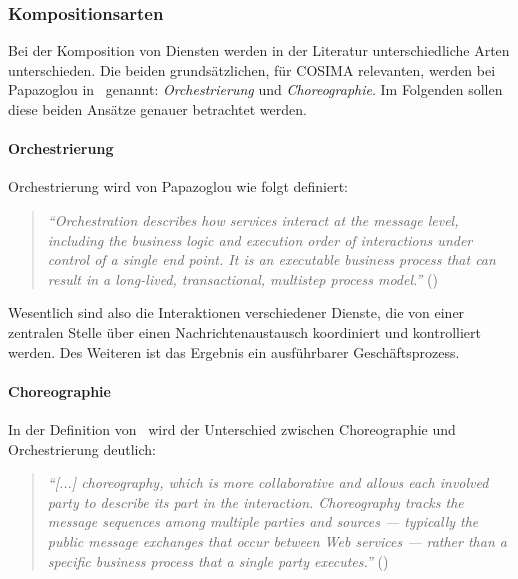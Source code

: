 \subsubsection{Kompositionsarten} %
\label{ssub:kompositionsarten}

  Bei der Komposition von Diensten werden in der Literatur unterschiedliche Arten unterschieden. Die beiden grundsätzlichen, für COSIMA relevanten, werden bei Papazoglou in~\citep[S. 41]{papazoglou2007soc} genannt: \emph{Orchestrierung} und \emph{Choreographie}. Im Folgenden sollen diese beiden Ansätze genauer betrachtet werden.
  
\paragraph{Orchestrierung} %
\label{par:orchestrierung}
  
  Orchestrierung wird von Papazoglou wie folgt definiert:
  
  \begin{quote}
    \emph{"`Orchestration describes how services interact at the message level, including the business logic and execution order of interactions under control of a single end point. It is an executable business process that can result in a long-lived, transactional, multistep process model."'} (\citep[S. 41]{papazoglou2007soc})
  \end{quote}
  
  Wesentlich sind also die Interaktionen verschiedener Dienste, die von einer zentralen Stelle über einen Nachrichtenaustausch koordiniert und kontrolliert werden. Des Weiteren ist das Ergebnis ein ausführbarer Geschäftsprozess.


\paragraph{Choreographie} %
\label{par:choreographie}

  In der Definition von~\citep{peltz2003wso} wird der Unterschied zwischen Choreographie und Orchestrierung deutlich:
  
  \begin{quote}
    \emph{"`[...] choreography, which is more collaborative and allows each involved party to describe its part in the interaction. Choreography tracks the message sequences among multiple parties and sources --- typically the public message exchanges that occur between Web services --- rather than a specific business process that a single party executes."'} (\citep[S. 46]{peltz2003wso})
  \end{quote}

